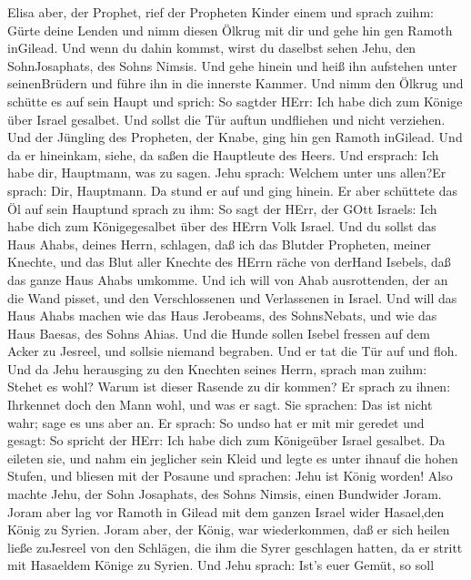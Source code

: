  Elisa aber, der Prophet, rief der Propheten Kinder einem
und sprach zuihm: Gürte deine Lenden und nimm diesen Ölkrug mit dir und
gehe hin gen Ramoth inGilead.  Und wenn du dahin kommst,
wirst du daselbst sehen Jehu, den SohnJosaphats, des Sohns Nimsis. Und
gehe hinein und heiß ihn aufstehen unter seinenBrüdern und führe ihn in
die innerste Kammer.  Und nimm den Ölkrug und schütte es auf
sein Haupt und sprich: So sagtder HErr: Ich habe dich zum Könige über
Israel gesalbet. Und sollst die Tür auftun undfliehen und nicht
verziehen.  Und der Jüngling des Propheten, der Knabe, ging
hin gen Ramoth inGilead.  Und da er hineinkam, siehe, da
saßen die Hauptleute des Heers. Und ersprach: Ich habe dir, Hauptmann,
was zu sagen. Jehu sprach: Welchem unter uns allen?Er sprach: Dir,
Hauptmann.  Da stund er auf und ging hinein. Er aber
schüttete das Öl auf sein Hauptund sprach zu ihm: So sagt der HErr, der
GOtt Israels: Ich habe dich zum Königegesalbet über des HErrn Volk
Israel.  Und du sollst das Haus Ahabs, deines Herrn,
schlagen, daß ich das Blutder Propheten, meiner Knechte, und das Blut
aller Knechte des HErrn räche von derHand Isebels,  daß das
ganze Haus Ahabs umkomme. Und ich will von Ahab ausrottenden, der an die
Wand pisset, und den Verschlossenen und Verlassenen in Israel.
 Und will das Haus Ahabs machen wie das Haus Jerobeams, des
SohnsNebats, und wie das Haus Baesas, des Sohns Ahias.  Und
die Hunde sollen Isebel fressen auf dem Acker zu Jesreel, und sollsie
niemand begraben. Und er tat die Tür auf und floh.  Und da
Jehu herausging zu den Knechten seines Herrn, sprach man zuihm: Stehet
es wohl? Warum ist dieser Rasende zu dir kommen? Er sprach zu ihnen:
Ihrkennet doch den Mann wohl, und was er sagt.  Sie
sprachen: Das ist nicht wahr; sage es uns aber an. Er sprach: So undso
hat er mit mir geredet und gesagt: So spricht der HErr: Ich habe dich
zum Königeüber Israel gesalbet.  Da eileten sie, und nahm
ein jeglicher sein Kleid und legte es unter ihnauf die hohen Stufen, und
bliesen mit der Posaune und sprachen: Jehu ist König worden!
 Also machte Jehu, der Sohn Josaphats, des Sohns Nimsis,
einen Bundwider Joram. Joram aber lag vor Ramoth in Gilead mit dem
ganzen Israel wider Hasael,den König zu Syrien.  Joram
aber, der König, war wiederkommen, daß er sich heilen ließe zuJesreel
von den Schlägen, die ihm die Syrer geschlagen hatten, da er stritt mit
Hasaeldem Könige zu Syrien. Und Jehu sprach: Ist's euer Gemüt, so soll
